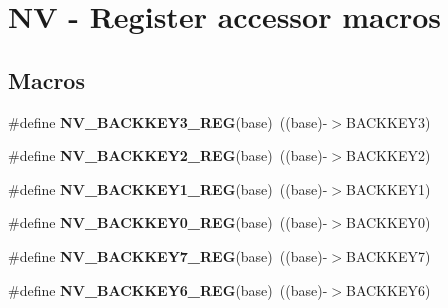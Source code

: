 \hypertarget{group___n_v___register___accessor___macros}{}\section{NV -\/ Register accessor macros}
\label{group___n_v___register___accessor___macros}
\subsection*{Macros}
\begin{DoxyCompactItemize}
\item 
\mbox{\label{group___n_v___register___accessor___macros_gafc7fe743ed5040278c07df44c3679f34}} 
\#define {\bfseries N\+V\+\_\+\+B\+A\+C\+K\+K\+E\+Y3\+\_\+\+R\+EG}(base)~((base)-\/$>$B\+A\+C\+K\+K\+E\+Y3)
\item 
\mbox{\label{group___n_v___register___accessor___macros_gac4ba0b0f5728c1f8cccf007efe73b218}} 
\#define {\bfseries N\+V\+\_\+\+B\+A\+C\+K\+K\+E\+Y2\+\_\+\+R\+EG}(base)~((base)-\/$>$B\+A\+C\+K\+K\+E\+Y2)
\item 
\mbox{\label{group___n_v___register___accessor___macros_ga7d1008712187c004855ee43a54b4e2a6}} 
\#define {\bfseries N\+V\+\_\+\+B\+A\+C\+K\+K\+E\+Y1\+\_\+\+R\+EG}(base)~((base)-\/$>$B\+A\+C\+K\+K\+E\+Y1)
\item 
\mbox{\label{group___n_v___register___accessor___macros_ga2fb8743f4bd1477b6df6081156659fe4}} 
\#define {\bfseries N\+V\+\_\+\+B\+A\+C\+K\+K\+E\+Y0\+\_\+\+R\+EG}(base)~((base)-\/$>$B\+A\+C\+K\+K\+E\+Y0)
\item 
\mbox{\label{group___n_v___register___accessor___macros_ga4e4a56e18420d4898e7f8804b722536e}} 
\#define {\bfseries N\+V\+\_\+\+B\+A\+C\+K\+K\+E\+Y7\+\_\+\+R\+EG}(base)~((base)-\/$>$B\+A\+C\+K\+K\+E\+Y7)
\item 
\mbox{\label{group___n_v___register___accessor___macros_ga66028631e0b19586c65f3db951474e08}} 
\#define {\bfseries N\+V\+\_\+\+B\+A\+C\+K\+K\+E\+Y6\+\_\+\+R\+EG}(base)~((base)-\/$>$B\+A\+C\+K\+K\+E\+Y6)

\end{DoxyCompactItemize}
